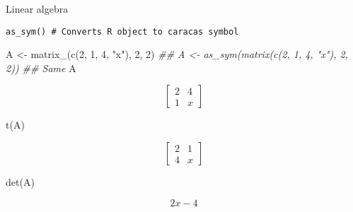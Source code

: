 \documentclass[
  ignorenonframetext,
]{beamer}
\newenvironment{Shaded}{\begin{snugshade}}{\end{snugshade}}
\newcommand{\DecValTok}[1]{\textcolor[rgb]{0.68,0.00,0.00}{#1}}
\newcommand{\DocumentationTok}[1]{\textcolor[rgb]{0.37,0.37,0.37}{\textit{#1}}}
\newcommand{\FunctionTok}[1]{\textcolor[rgb]{0.28,0.35,0.67}{#1}}
\newcommand{\NormalTok}[1]{\textcolor[rgb]{0.00,0.23,0.31}{#1}}
\newcommand{\OtherTok}[1]{\textcolor[rgb]{0.00,0.23,0.31}{#1}}
\newcommand{\StringTok}[1]{\textcolor[rgb]{0.13,0.47,0.30}{#1}}
\begin{document}
\begin{frame}[fragile]{Linear algebra}
\protect\hypertarget{linear-algebra}{}
\begin{verbatim}
as_sym() # Converts R object to caracas symbol
\end{verbatim}

\begin{Shaded}
\begin{Highlighting}[]
\NormalTok{A }\OtherTok{\textless{}{-}} \FunctionTok{matrix\_}\NormalTok{(}\FunctionTok{c}\NormalTok{(}\DecValTok{2}\NormalTok{, }\DecValTok{1}\NormalTok{, }\DecValTok{4}\NormalTok{, }\StringTok{"x"}\NormalTok{), }\DecValTok{2}\NormalTok{, }\DecValTok{2}\NormalTok{)}
\DocumentationTok{\#\# A \textless{}{-} as\_sym(matrix(c(2, 1, 4, "x"), 2, 2)) \#\# Same}
\NormalTok{A}
\end{Highlighting}
\end{Shaded}

\[\left[\begin{matrix}2 & 4\\1 & x\end{matrix}\right]\]

\begin{Shaded}
\begin{Highlighting}[]
\FunctionTok{t}\NormalTok{(A)}
\end{Highlighting}
\end{Shaded}

\[\left[\begin{matrix}2 & 1\\4 & x\end{matrix}\right]\]

\begin{Shaded}
\begin{Highlighting}[]
\FunctionTok{det}\NormalTok{(A)}
\end{Highlighting}
\end{Shaded}

\[2 x - 4\]
\end{frame}
\end{document}
